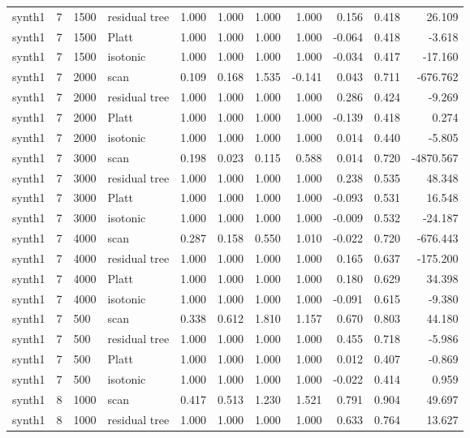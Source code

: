 \begin{tabular}{lrllrrrrrrr}
synth1 & 7 & 1500 & residual tree & 1.000 & 1.000 & 1.000 & 1.000 & 0.156 & 0.418 & 26.109 \\
synth1 & 7 & 1500 & Platt & 1.000 & 1.000 & 1.000 & 1.000 & -0.064 & 0.418 & -3.618 \\
synth1 & 7 & 1500 & isotonic & 1.000 & 1.000 & 1.000 & 1.000 & -0.034 & 0.417 & -17.160 \\
synth1 & 7 & 2000 & scan & 0.109 & 0.168 & 1.535 & -0.141 & 0.043 & 0.711 & -676.762 \\
synth1 & 7 & 2000 & residual tree & 1.000 & 1.000 & 1.000 & 1.000 & 0.286 & 0.424 & -9.269 \\
synth1 & 7 & 2000 & Platt & 1.000 & 1.000 & 1.000 & 1.000 & -0.139 & 0.418 & 0.274 \\
synth1 & 7 & 2000 & isotonic & 1.000 & 1.000 & 1.000 & 1.000 & 0.014 & 0.440 & -5.805 \\
synth1 & 7 & 3000 & scan & 0.198 & 0.023 & 0.115 & 0.588 & 0.014 & 0.720 & -4870.567 \\
synth1 & 7 & 3000 & residual tree & 1.000 & 1.000 & 1.000 & 1.000 & 0.238 & 0.535 & 48.348 \\
synth1 & 7 & 3000 & Platt & 1.000 & 1.000 & 1.000 & 1.000 & -0.093 & 0.531 & 16.548 \\
synth1 & 7 & 3000 & isotonic & 1.000 & 1.000 & 1.000 & 1.000 & -0.009 & 0.532 & -24.187 \\
synth1 & 7 & 4000 & scan & 0.287 & 0.158 & 0.550 & 1.010 & -0.022 & 0.720 & -676.443 \\
synth1 & 7 & 4000 & residual tree & 1.000 & 1.000 & 1.000 & 1.000 & 0.165 & 0.637 & -175.200 \\
synth1 & 7 & 4000 & Platt & 1.000 & 1.000 & 1.000 & 1.000 & 0.180 & 0.629 & 34.398 \\
synth1 & 7 & 4000 & isotonic & 1.000 & 1.000 & 1.000 & 1.000 & -0.091 & 0.615 & -9.380 \\
synth1 & 7 & 500 & scan & 0.338 & 0.612 & 1.810 & 1.157 & 0.670 & 0.803 & 44.180 \\
synth1 & 7 & 500 & residual tree & 1.000 & 1.000 & 1.000 & 1.000 & 0.455 & 0.718 & -5.986 \\
synth1 & 7 & 500 & Platt & 1.000 & 1.000 & 1.000 & 1.000 & 0.012 & 0.407 & -0.869 \\
synth1 & 7 & 500 & isotonic & 1.000 & 1.000 & 1.000 & 1.000 & -0.022 & 0.414 & 0.959 \\
synth1 & 8 & 1000 & scan & 0.417 & 0.513 & 1.230 & 1.521 & 0.791 & 0.904 & 49.697 \\
synth1 & 8 & 1000 & residual tree & 1.000 & 1.000 & 1.000 & 1.000 & 0.633 & 0.764 & 13.627 \\

\end{tabular}

